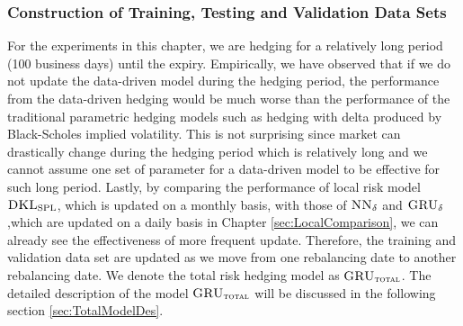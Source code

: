 \documentclass[letterpaper,12pt,titlepage,oneside,final]{book}
\numberwithin{equation}{section}
\theoremstyle{definition}
\newcommand{\model}{\textsc{GRU}_\delta}
\newcommand{\modelT}{\textsc{GRU}_{\textsc{total}}}
\newcommand{\modelN}{\textsc{NN}_\delta}
\newcommand{\Vmkt}{V^{mkt}}
\newcommand{\DKLs}{\bf\textsc{DKL}_{\text{SPL}}}
\begin{document}
\begin{enumerate}
\end{enumerate}

\subsubsection{Construction of Training, Testing and Validation Data Sets}
For the experiments in this chapter, we are hedging for a relatively long period (100 business days) until the expiry.  Empirically, we have observed that if we do not update the data-driven model during the hedging period, the performance from the data-driven hedging would be much worse than the performance of the traditional parametric hedging models such as hedging with delta produced by Black-Scholes implied volatility. This is not surprising since market can drastically change during the hedging period which is relatively long and we cannot assume one set of parameter for a data-driven model to be effective for such long period. Lastly, by comparing the performance of local risk model  $\DKLs$, which is updated on a monthly basis,  with those of $\modelN$ and $\model$ ,which are updated on a daily basis in Chapter \ref{sec:LocalComparison}, we can already see the effectiveness of more frequent update.  Therefore, the training and validation data set are updated as we move from one rebalancing date to another rebalancing date. We denote the total risk hedging model as $\modelT$. The detailed description of the model $\modelT$ will be discussed in the following section \ref{sec:TotalModelDes}.
\end{document}
